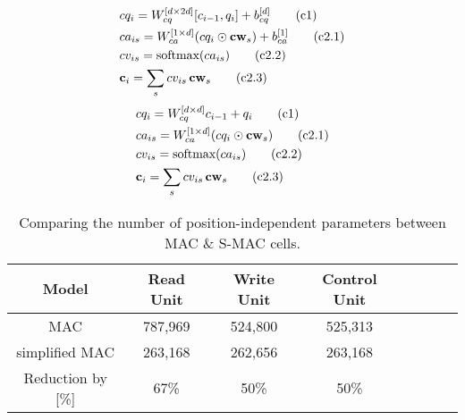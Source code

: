 \begin{multicols}{2}
	\noindent
	\begin{align*}
	&cq_i = W_{cq}^{[d \times 2d]} [c_{i-1}, q_i] + b_{cq}^{[d]}  \tag{c1} \\
	&ca_{is} = W_{ca}^{[1 \times d]} (cq_i \odot \mathbf{cw}_s) + b_{ca}^{[1]}
	\tag{c2.1}\\
	&cv_{is} = \textrm{softmax}(ca_{is}) \tag{c2.2}\\
	&\mathbf{c}_i = \sum_s cv_{is} \, \mathbf{cw}_s  \tag{c2.3}
	\end{align*}
	\columnbreak
	{\color{Plum}
	\begin{align*}
	&cq_i = W_{cq}^{[d \times d]} c_{i-1} + q_i  \tag{c1} \\
	&ca_{is} = W_{ca}^{[1 \times d]} (cq_i \odot \mathbf{cw}_s)  \tag{c2.1}\\
	&cv_{is} = \textrm{softmax}(ca_{is}) \tag{c2.2}\\
	&\mathbf{c}_i = \sum_s cv_{is} \, \mathbf{cw}_s  \tag{c2.3}
    \end{align*}}
\end{multicols}

\begin{table}[hb]
	\centering
	\begin{tabular}{ccccCcCc}
		\toprule
		Model        & Read Unit               & Write Unit &  Control Unit         \\
		\midrule
		MAC   &  787,969 &  524,800        &    525,313    \\
		simplified MAC & 263,168  & 262,656       &    263,168 \\
		\midrule
		Reduction by [\%]  & 67\%  &   50\%       &      50\%  \\
		\bottomrule
	\end{tabular}
	\caption{Comparing the number of position-independent parameters between MAC \& S-MAC cells. }
	\label{tab:parameters}
\end{table}

\newpage

